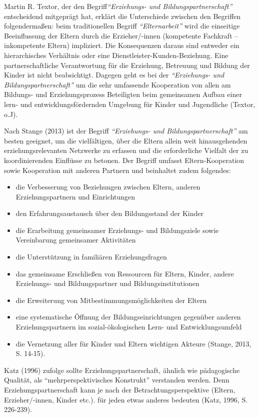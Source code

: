 \documentclass[12pt,a4paper]{article}
\begin{document}
Martin R. Textor, der den Begriff\textit{"`Erziehungs- und Bildungspartnerschaft"'} entscheidend mitgeprägt hat, erklärt die Unterschiede zwischen den Begriffen folgendermaßen: beim traditionellen Begriff \textit{"`Elternarbeit"'} wird die einseitige Beeinflussung der Eltern durch die Erzieher/-innen (kompetente Fachkraft – inkompetente Eltern) impliziert. Die Konsequenzen daraus sind entweder ein hierarchisches Verhältnis oder eine Dienstleister-Kunden-Beziehung. Eine partnerschaftliche Verantwortung für die Erziehung, Betreuung und Bildung der Kinder ist nicht beabsichtigt. Dagegen geht es bei der \textit{"`Erziehungs- und Bildungspartnerschaft"'} um die sehr umfassende Kooperation von allen am Bildungs- und Erziehungsprozess Beteiligten beim gemeinsamen Aufbau einer lern- und entwicklungsfördernden Umgebung für Kinder und Jugendliche (Textor, o.J).

	Nach Stange (2013) ist der Begriff \textit{"`Erziehungs- und Bildungspartnerschaft"'} am besten geeignet, um die vielfältigen, über die Eltern allein weit hinausgehenden erziehungsrelevanten Netzwerke zu erfassen und die erforderliche Vielfalt der zu koordinierenden Einflüsse zu betonen. Der Begriff umfasst Eltern-Kooperation sowie Kooperation mit anderen Partnern und beinhaltet zudem folgendes:
	\begin{itemize}
\item die Verbesserung von Beziehungen zwischen Eltern, anderen Erziehungspartnern und Einrichtungen
\item den Erfahrungsaustausch über den Bildungsstand der Kinder
\item die Erarbeitung gemeinsamer Erziehungs- und Bildungsziele sowie Vereinbarung gemeinsamer Aktivitäten
\item die Unterstützung in familiären Erziehungsfragen
\item das gemeinsame Erschließen von Ressourcen für Eltern, Kinder, andere Erziehungs- und Bildungspartner und Bildungsinstitutionen
\item die Erweiterung von Mitbestimmungsmöglichkeiten der Eltern
\item eine systematische Öffnung der Bildungseinrichtungen gegenüber anderen Erziehungspartnern im sozial-ökologischen Lern- und Entwicklungsumfeld
\item die Vernetzung aller für Kinder und Eltern wichtigen Akteure
(Stange, 2013, S. 14-15).
\end{itemize}

	Katz (1996) zufolge sollte Erziehungspartnerschaft, ähnlich wie pädagogische Qualität, als "`mehrperspektivisches Konstrukt"' verstanden werden. Denn Erziehungspartnerschaft kann je nach der Betrachtungsperspektive (Eltern, Erzieher/-innen, Kinder etc.). für jeden etwas anderes bedeuten (Katz, 1996, S. 226-239).
	
\end{document}
